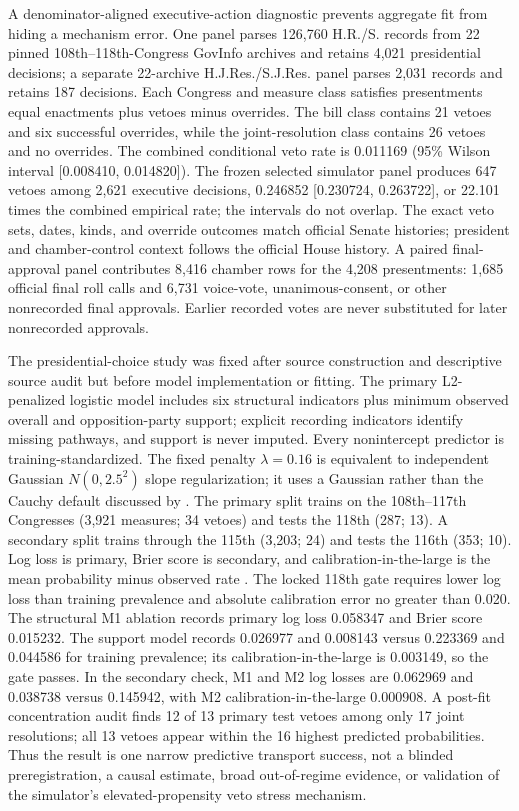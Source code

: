 \documentclass[manuscript]{acmart}
\begin{document}
A denominator-aligned executive-action diagnostic prevents aggregate fit from hiding a mechanism error. One panel parses 126,760 H.R./S. records from 22 pinned 108th--118th-Congress GovInfo archives and retains 4,021 presidential decisions; a separate 22-archive H.J.Res./S.J.Res. panel parses 2,031 records and retains 187 decisions. Each Congress and measure class satisfies presentments equal enactments plus vetoes minus overrides. The bill class contains 21 vetoes and six successful overrides, while the joint-resolution class contains 26 vetoes and no overrides. The combined conditional veto rate is 0.011169 (95\% Wilson interval [0.008410, 0.014820]). The frozen selected simulator panel produces 647 vetoes among 2,621 executive decisions, 0.246852 [0.230724, 0.263722], or 22.101 times the combined empirical rate; the intervals do not overlap. The exact veto sets, dates, kinds, and override outcomes match official Senate histories; president and chamber-control context follows the official House history. A paired final-approval panel contributes 8,416 chamber rows for the 4,208 presentments: 1,685 official final roll calls and 6,731 voice-vote, unanimous-consent, or other nonrecorded final approvals. Earlier recorded votes are never substituted for later nonrecorded approvals.

The presidential-choice study was fixed after source construction and descriptive source audit but before model implementation or fitting. The primary L2-penalized logistic model includes six structural indicators plus minimum observed overall and opposition-party support; explicit recording indicators identify missing pathways, and support is never imputed. Every nonintercept predictor is training-standardized. The fixed penalty \(\lambda=0.16\) is equivalent to independent Gaussian \(N(0,2.5^2)\) slope regularization; it uses a Gaussian rather than the Cauchy default discussed by \citet{GelmanEtAl2008}. The primary split trains on the 108th--117th Congresses (3,921 measures; 34 vetoes) and tests the 118th (287; 13). A secondary split trains through the 115th (3,203; 24) and tests the 116th (353; 10). Log loss is primary, Brier score is secondary, and calibration-in-the-large is the mean probability minus observed rate \citep{GneitingRaftery2007}. The locked 118th gate requires lower log loss than training prevalence and absolute calibration error no greater than 0.020. The structural M1 ablation records primary log loss 0.058347 and Brier score 0.015232. The support model records 0.026977 and 0.008143 versus 0.223369 and 0.044586 for training prevalence; its calibration-in-the-large is 0.003149, so the gate passes. In the secondary check, M1 and M2 log losses are 0.062969 and 0.038738 versus 0.145942, with M2 calibration-in-the-large 0.000908. A post-fit concentration audit finds 12 of 13 primary test vetoes among only 17 joint resolutions; all 13 vetoes appear within the 16 highest predicted probabilities. Thus the result is one narrow predictive transport success, not a blinded preregistration, a causal estimate, broad out-of-regime evidence, or validation of the simulator's elevated-propensity veto stress mechanism.
\end{document}
